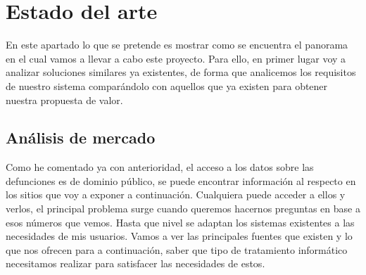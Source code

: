 \chapter{Estado del arte}
\label{sec:estadoArte}
En este apartado lo que se pretende es mostrar como se encuentra el panorama en el cual vamos
a llevar a cabo este proyecto. Para ello, en primer lugar voy a analizar soluciones
similares ya existentes, de forma que analicemos los requisitos de nuestro sistema
comparándolo con aquellos que ya existen para obtener nuestra propuesta de valor.

\section{Análisis de mercado}

Como he comentado ya con anterioridad, el acceso a los datos sobre las defunciones es de
dominio público, se puede encontrar información al respecto en los sitios que voy a
exponer a continuación. Cualquiera puede acceder a ellos y verlos, el principal problema
surge cuando queremos hacernos preguntas en base a esos números que vemos. Hasta que nivel
se adaptan los sistemas existentes a las necesidades de mis usuarios. Vamos a ver las
principales fuentes que existen y lo que nos ofrecen para a continuación, saber que tipo
de tratamiento informático necesitamos realizar para satisfacer las necesidades de estos.


